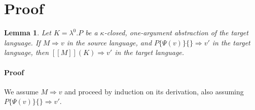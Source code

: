 \documentclass[a4paper,11pt]{article}
\newtheorem{lemma}{Lemma}
\begin{document}
\section{Proof}\label{sec:proof}

\begin{lemma}
  Let $K = \lambda^{0}.P$ be a $\kappa$-closed, one-argument
  abstraction of the target language. If $M \Rightarrow v$ in the
  source language, and $P\{\Psi(v)\}\{\} \Rightarrow v'$ in the target
  language, then $[\![M]\!](K) \Rightarrow v'$ in the target language.
\end{lemma}

\paragraph{Proof}

We assume $M \Rightarrow v$ and proceed by induction on its derivation, also
assuming $P\{\Psi(v)\}\{\} \Rightarrow v'$.

\end{document}
